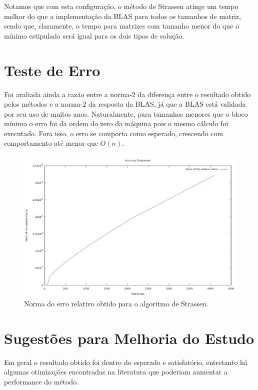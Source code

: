 \documentclass[12pt,a4paper,onecolumn]{article}
\begin{document}
Notamos que com esta configuração, o método de Strassen atinge um tempo melhor do que a implementação da BLAS para todos os tamanhos de matriz, sendo que,
claramente, o tempo para matrizes com tamanho menor do que o mínimo estipulado será igual para os dois tipos de solução.

\section*{Teste de Erro}

Foi avaliada ainda a razão entre a norma-$2$ da diferença entre o resultado obtido pelos métodos e a norma-$2$ da resposta da BLAS, já que a BLAS está validada por seu uso de muitos anos.
Naturalmente, para tamanhos menores que o bloco mínimo o erro foi da ordem do zero da máquina pois o mesmo cálculo foi executado. Fora isso, o erro se comporta como esperado,
crescendo com comportamento até menor que $O(n)$.

\begin{figure}[H]
\centering
\includegraphics[width=1\linewidth]
{./figures/residue.pdf}
\caption{Norma do erro relativo obtido para o algoritmo de Strassen.} 
\label{residue}
\end{figure}

\section*{Sugestões para Melhoria do Estudo}

Em geral o resultado obtido foi dentro do esperado e satisfatório, entretanto há algumas otimizações encontradas na literatura que poderiam aumentar a performance do método.
\end{document}
